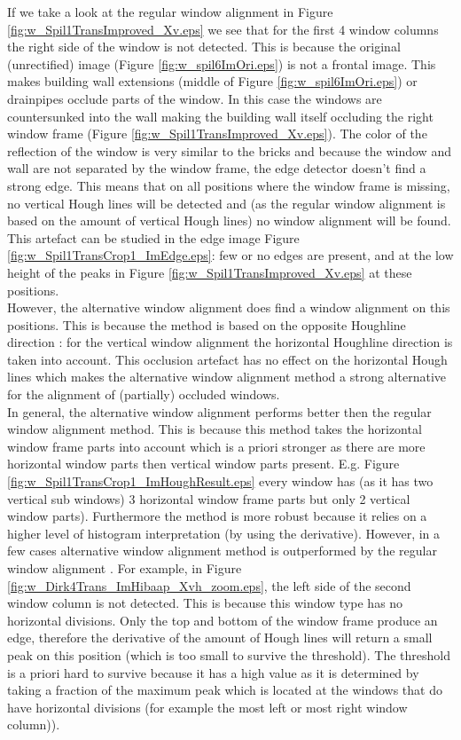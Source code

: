 \label{lab:occlusion} If we take a look at the regular window alignment in
Figure \ref{fig:w_Spil1TransImproved_Xv.eps} we see that for the first 4 window
columns the right side of the window is not detected.  This is because the
original (unrectified) image (Figure \ref{fig:w_spil6ImOri.eps}) is not a
frontal image.  This makes building wall extensions (middle of Figure
\ref{fig:w_spil6ImOri.eps}) or drainpipes occlude parts of the window.  In this
case the windows are countersunked into the wall making the building wall itself
occluding the right window frame (Figure \ref{fig:w_Spil1TransImproved_Xv.eps}).
The color of the reflection of the window is very similar to the bricks and
because the window and wall are not separated by the window frame, the edge
detector doesn't find a strong edge.  This means that on all positions where the
window frame is missing, no vertical Hough lines will be detected and (as the
regular window alignment is based on the amount of vertical Hough lines) no window
alignment will be found.  This artefact can be studied in the edge image Figure
\ref{fig:w_Spil1TransCrop1_ImEdge.eps}: few or no edges are present, and at the
low height of the peaks in Figure \ref{fig:w_Spil1TransImproved_Xv.eps} at these
positions.\\

However, the alternative window alignment does find a window alignment on this
positions. This is because the method is based on the opposite Houghline
direction : for the vertical window alignment the horizontal Houghline direction
is taken into account.  This occlusion artefact has no effect on the horizontal
Hough lines which makes the alternative window alignment method a strong
alternative for the alignment of (partially) occluded windows.\\

In general, the alternative window alignment performs better then the regular
window alignment method.  This is because this method takes the  horizontal
window frame parts into account which is a priori stronger as there are more
horizontal window parts then vertical window parts present.  E.g. Figure
\ref{fig:w_Spil1TransCrop1_ImHoughResult.eps} every window has (as it has two
vertical sub windows) 3 horizontal window frame parts but only 2 vertical window
parts).  Furthermore the method is more robust because it relies on a higher
level of histogram interpretation (by using the derivative).  However, in a few
cases alternative window alignment method is outperformed by the regular window
alignment . For example, in Figure
\ref{fig:w_Dirk4Trans_ImHibaap_Xvh_zoom.eps}, the left
side of the second window column is not detected.
This is because this window type has no horizontal divisions. Only the top and
bottom of the window frame produce an edge, therefore the derivative of the
amount of Hough lines will return a small peak on this position (which is too
small to survive the threshold).  
The threshold is a priori hard to survive because it has a high value as it is
determined by taking a fraction of the maximum peak which is located at the
windows that do have horizontal divisions (for example the most left or most
right window column)). 


